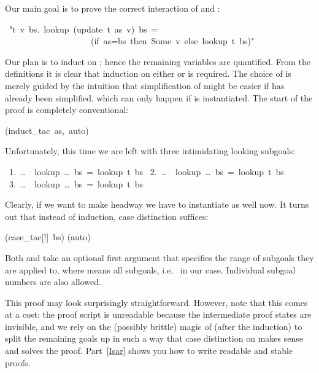 \begin{isabelle}
\begin{isamarkuptext}
Our main goal is to prove the correct interaction of  and
:%
\end{isamarkuptext}%
\ {"}{\isasymforall}t\ v\ bs.\ lookup\ (update\ t\ as\ v)\ bs\ =\isanewline
\ \ \ \ \ \ \ \ \ \ \ \ \ \ \ \ \ \ \ \ (if\ as=bs\ then\ Some\ v\ else\ lookup\ t\ bs){"}%
\begin{isamarkuptxt}%
\noindent
Our plan is to induct on ; hence the remaining variables are
quantified. From the definitions it is clear that induction on either
 or  is required. The choice of  is merely
guided by the intuition that simplification of  might be easier
if  has already been simplified, which can only happen if
 is instantiated.
The start of the proof is completely conventional:%
\end{isamarkuptxt}%
(induct\_tac\ as,\ auto)%
\begin{isamarkuptxt}%
\noindent
Unfortunately, this time we are left with three intimidating looking subgoals:
\begin{isabellepar}%
~1.~\dots~{\isasymLongrightarrow}~lookup~\dots~bs~=~lookup~t~bs\isanewline
~2.~\dots~{\isasymLongrightarrow}~lookup~\dots~bs~=~lookup~t~bs\isanewline
~3.~\dots~{\isasymLongrightarrow}~lookup~\dots~bs~=~lookup~t~bs%
\end{isabellepar}%
Clearly, if we want to make headway we have to instantiate  as
well now. It turns out that instead of induction, case distinction
suffices:%
\end{isamarkuptxt}%
(case\_tac[!]\ bs)\isanewline
{}(auto)%
\begin{isamarkuptext}%
\noindent
Both  and 
take an optional first argument that specifies the range of subgoals they are
applied to, where \isa{!} means all subgoals, i.e.\ \isa{[1-3]} in our case. Individual
subgoal numbers are also allowed.

This proof may look surprisingly straightforward. However, note that this
comes at a cost: the proof script is unreadable because the
intermediate proof states are invisible, and we rely on the (possibly
brittle) magic of  (after the induction) to split the remaining
goals up in such a way that case distinction on  makes sense and
solves the proof. Part~\ref{Isar} shows you how to write readable and stable
proofs.%
\end{isamarkuptext}%
\end{isabelle}%
